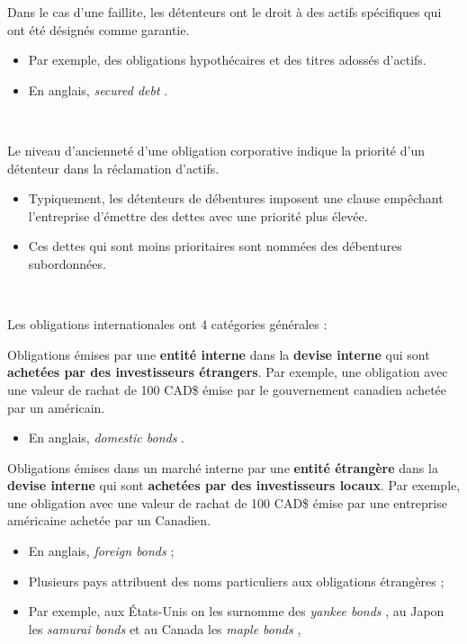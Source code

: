 \documentclass[10pt, french]{article}
\begin{document}
\begin{multicols*}{2}
\begin{definitionNOHFILLprop}
Dans le cas d'une faillite, les détenteurs ont le droit à des actifs spécifiques qui ont été désignés comme garantie.

\begin{itemize}
	\item	Par exemple, des obligations hypothécaires et des titres adossés d'actifs.
	\item	En anglais, \og \textit{secured debt} \fg{}.
\end{itemize}
\end{definitionNOHFILLprop}

\

Le niveau d'ancienneté d'une obligation corporative indique la priorité d'un détenteur dans la réclamation d'actifs.
\begin{itemize}
	\item	Typiquement, les détenteurs de débentures imposent une clause empêchant l'entreprise d'émettre des dettes avec une priorité plus élevée.
	\item	Ces dettes qui sont moins prioritaires sont nommées des débentures subordonnées.
\end{itemize}

\

Les obligations internationales ont 4 catégories générales :
\begin{definitionNOHFILLprop}
Obligations émises par une \textbf{entité interne} dans la \textbf{devise interne} qui sont \textbf{achetées par des investisseurs étrangers}. Par exemple, une obligation avec une valeur de rachat de 100 CAD\$ émise par le gouvernement canadien achetée par un américain.
\begin{itemize}
	\item	En anglais, \og \textit{domestic bonds} \fg{}.
\end{itemize}
\end{definitionNOHFILLprop}

\begin{definitionNOHFILLprop}
Obligations émises dans un marché interne par une \textbf{entité étrangère} dans la \textbf{devise interne} qui sont \textbf{achetées par des investisseurs locaux}. Par exemple, une obligation avec une valeur de rachat de 100 CAD\$ émise par une entreprise américaine achetée par un Canadien.
\begin{itemize}
	\item	En anglais, \og \textit{foreign bonds} \fg{} ;
	\item	Plusieurs pays attribuent des noms particuliers aux obligations étrangères ;
	\item	Par exemple, aux États-Unis on les surnomme des \og \textit{yankee bonds} \fg{}, au Japon les \og \textit{samurai bonds} \fg{} et au Canada les \og \textit{maple bonds} \fg{},
\end{itemize}
\end{definitionNOHFILLprop}


\end{multicols*}
\end{document}
